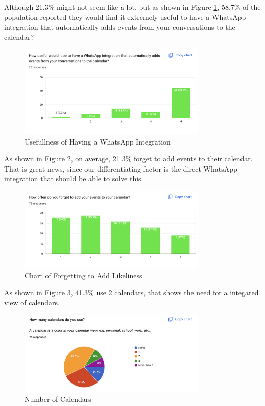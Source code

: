 \documentclass[12pt,a4paper]{report}
\begin{document}
Although 21.3\% might not seem like a lot, but as shown in Figure \ref{fig:usefullness}, 58.7\% of the population reported they would find it extremely useful to have a WhatsApp integration that automatically adds events from your conversations to the calendar?

\begin{figure}[!h]
    \centering
    \includegraphics[width=0.8\textwidth]{images/survey/usefullness.png}
    \caption{Usefullness of Having a WhatsApp Integration}
    \label{fig:usefullness}
\end{figure}

As shown in Figure \ref{fig:forget-to-add}, on average, 21.3\% forget to add events to their calendar. That is great news, since our differentiating factor is the direct WhatsApp integration that should be able to solve this.

\begin{figure}[!h]
    \centering
    \includegraphics[width=0.8\textwidth]{images/survey/forget-to-add.png}
    \caption{Chart of Forgetting to Add Likeliness}
    \label{fig:forget-to-add}
\end{figure}

As shown in Figure \ref{fig:number-of-calendars}, 41.3\% use 2 calendars, that shows the need for a integared view of calendars.

\begin{figure}[!h]
    \centering
    \includegraphics[width=0.8\textwidth]{images/survey/number-of-calendars.png}
    \caption{Number of Calendars}
    \label{fig:number-of-calendars}
\end{figure}
\end{document}
